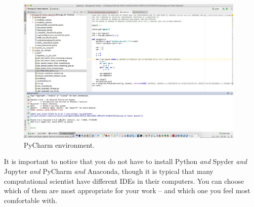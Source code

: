 \begin{figure}
\centering
\includegraphics[width=0.9\linewidth]{figures/ch3_pycharm}
\caption{PyCharm environment.}
\label{fig:pycharm}
\end{figure}


It is important to notice that you do not have to install Python
\textit{and} Spyder \textit{and} Jupyter \textit{and} PyCharm \textit{and} Anaconda,
though it is typical that many computational scientist have different
IDEs in their computers. You can choose which of them are most
appropriate for your work -- and which one you feel most comfortable with.
